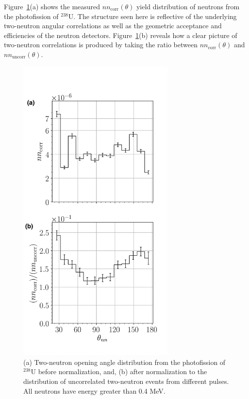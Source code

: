 Figure~\ref{fig:SPDPNormalization}(a) shows the measured $nn_{\text{corr}}(\theta)$ yield distribution of neutrons from the photofission of $^{238}$U.
The structure seen here is reflective of the underlying two-neutron angular correlations as well as the geometric acceptance and efficiencies of the neutron detectors.
Figure~\ref{fig:SPDPNormalization}(b) reveals how a clear picture of two-neutron correlations is produced by taking the ratio between $nn_{\text{corr}}(\theta)$ and $nn_{\text{uncorr}}(\theta)$.
\begin{figure}[]
\centering
    \includegraphics[width=0.7\textwidth]{Content/Methods/SPDPNormalization.png}
    \caption{(a) Two-neutron opening angle distribution from the photofission of $^{238}$U before normalization, and, (b) after normalization to the distribution of uncorrelated two-neutron events from different pulses. All neutrons have energy greater than 0.4 MeV.}
    \label{fig:SPDPNormalization}
\end{figure}

